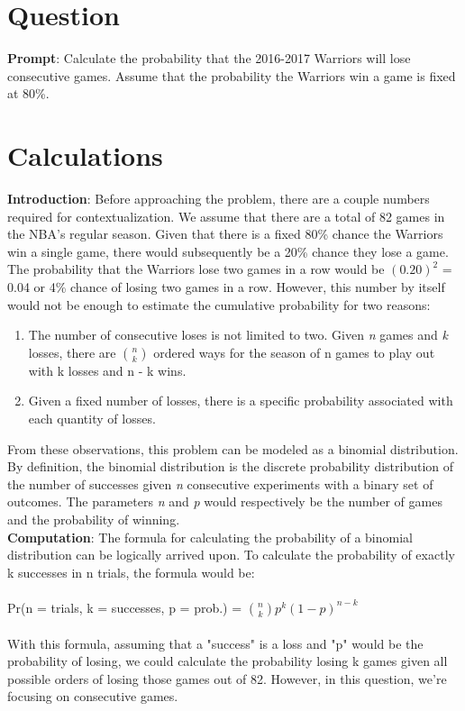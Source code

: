 \documentclass[11pt]{article}
\begin{document}
\maketitle

\section{Question}
\textbf{Prompt}: Calculate the probability that the 2016-2017 Warriors will lose consecutive games. Assume that the probability the Warriors win a game is fixed at 80\%.

\section{Calculations}
\textbf{Introduction}: Before approaching the problem, there are a couple numbers required for contextualization. We assume that there are a total of 82 games in the NBA's regular season. Given that there is a fixed 80\% chance the Warriors win a single game, there would subsequently be a 20\% chance they lose a game. The probability that the Warriors lose two games in a row would be \((0.20)^2\) = 0.04 or 4\% chance of losing two games in a row. However, this number by itself would not be enough to estimate the cumulative probability for two reasons:

\begin{enumerate}
	\item The number of consecutive loses is not limited to two. Given \textit{n} games and  \textit{k} losses, there are \({n \choose k}\) ordered ways for the season of n games to play out with k losses and n - k wins.  
	\item Given a fixed number of losses, there is a specific probability associated with each quantity of losses.
\end{enumerate}

From these observations, this problem can be modeled as a binomial distribution. By definition, the binomial distribution is the discrete probability distribution of the number of successes given \textit{n} consecutive experiments with a binary set of outcomes. The parameters \textit{n} and \textit{p} would respectively be the number of games and the probability of winning. \\

\textbf{Computation}:
The formula for calculating the probability of a binomial distribution can be logically arrived upon. To calculate the probability of exactly k successes in n trials, the formula would be:\\ \\
Pr(n = trials, k = successes, p = prob.) = \({n \choose k} p^k (1-p)^{n-k}\) \\ \\
With this formula, assuming that a "success" is a loss and "p" would be the probability of losing, we could calculate the probability losing k games given all possible orders of losing those games out of 82. However, in this question, we're focusing on consecutive games.\\
\end{document}
